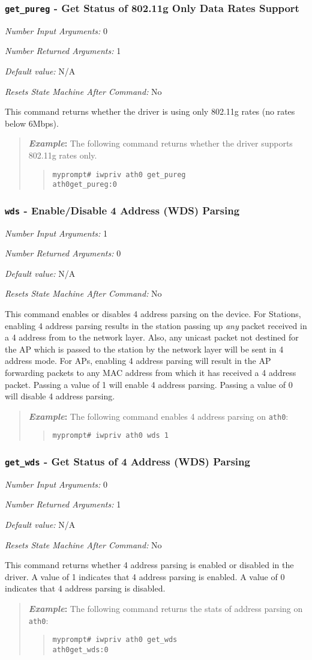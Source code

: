 \documentclass[10pt,fullpage]{article}
\newcommand{\mytt}[1]{{\texttt{#1}}}
\newcommand{\bv}{\begin{verse}}
\newcommand{\ev}{\end{verse}}
\newcommand{\cmd}[1]{{\texttt{myprompt\# #1}}}
\newcommand{\argdesc}[4]{\begin{description}
\itemsep -6pt
\item \textit{Number Input Arguments:} #1
\item \textit{Number Returned Arguments:} #2
\item \textit{Default value:} #3
\item \textit{Resets State Machine After Command:} #4
\end{description}
}
\newenvironment{example}{\begin{quote}\textbf{\textit{Example}:}}{\end{quote}}
\begin{document}
\subsubsection{\mytt{get\_pureg} - Get Status of 802.11g Only Data Rates Support}
\argdesc{0}{1}{N/A}{No}
This command returns whether the driver is using only 802.11g rates
(no rates below 6Mbps).
\begin{example}
The following command returns whether the driver supports 802.11g
rates only.
\bv
\cmd{iwpriv ath0 get\_pureg}\\
\mytt{ath0\hspace{32pt}get\_pureg:0}
\ev
\end{example}

\subsubsection{\mytt{wds} - Enable/Disable 4 Address (WDS) Parsing}
\argdesc{1}{0}{N/A}{No}
This command enables or disables 4 address parsing on the device.  For
Stations, enabling 4 address parsing results in the station passing up
\emph{any} packet received in a 4 address from to the network layer.
Also, any unicast packet not destined for the AP which is passed to
the station by the network layer will be sent in 4 address mode.  For
APs, enabling 4 address parsing will result in the AP forwarding
packets to any MAC address from which it has received a 4 address
packet.  Passing a value of 1 will enable 4 address parsing.  Passing
a value of 0 will disable 4 address parsing.
\begin{example}
The following command enables 4 address parsing on \mytt{ath0}:
\bv
\cmd{iwpriv ath0 wds 1}
\ev
\end{example}

\subsubsection{\mytt{get\_wds} - Get Status of 4 Address (WDS) Parsing}
\argdesc{0}{1}{N/A}{No}
This command returns whether 4 address parsing is enabled or disabled
in the driver.  A value of 1 indicates that 4 address parsing is
enabled. A value of 0 indicates that 4 address parsing is disabled.
\begin{example}
The following command returns the stats of address parsing on \mytt{ath0}:
\bv
\cmd{iwpriv ath0 get\_wds}\\
\mytt{ath0\hspace{32pt}get\_wds:0}
\ev
\end{example}
\end{document}
